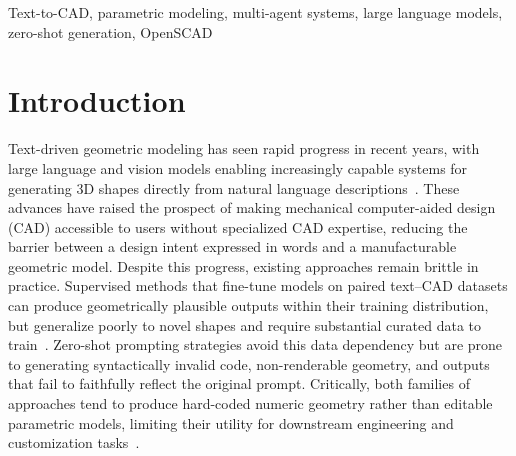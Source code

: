 \documentclass[conference]{IEEEtran}
\begin{document}
\begin{IEEEkeywords}
Text-to-CAD, parametric modeling, multi-agent systems, large language models, zero-shot generation, OpenSCAD
\end{IEEEkeywords}


\section{Introduction}
\label{Sec:intro}

Text-driven geometric modeling has seen rapid progress in recent years, with large language and vision models enabling increasingly capable systems for generating 3D shapes directly from natural language descriptions~\citep{zhang2026llmcad,poole2023dreamfusion,jun2023shape,nichol2022pointe}. These advances have raised the prospect of making mechanical computer-aided design (CAD) accessible to users without specialized CAD expertise, reducing the barrier between a design intent expressed in words and a manufacturable geometric model. Despite this progress, existing approaches remain brittle in practice. Supervised methods that fine-tune models on paired text--CAD datasets can produce geometrically plausible outputs within their training distribution, but generalize poorly to novel shapes and require substantial curated data to train~\citep{text2cad2024,cadcoder2025,text2cadquery2025,li2025llm4cad}. Zero-shot prompting strategies avoid this data dependency but are prone to generating syntactically invalid code, non-renderable geometry, and outputs that fail to faithfully reflect the original prompt. Critically, both families of approaches tend to produce hard-coded numeric geometry rather than editable parametric models, limiting their utility for downstream engineering and customization tasks~\citep{wu2021deepcad,fusion360gallery2021}.
\end{document}
